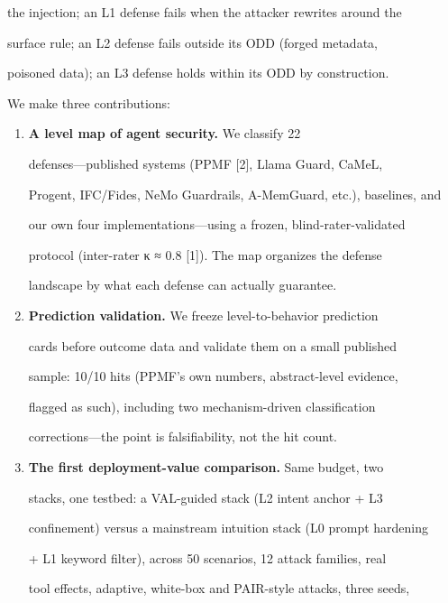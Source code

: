 \documentclass[

]{article}
\begin{document}
the injection; an L1 defense fails when the attacker rewrites around the

surface rule; an L2 defense fails outside its ODD (forged metadata,

poisoned data); an L3 defense holds within its ODD by construction.



We make three contributions:



\begin{enumerate}

\def\labelenumi{\arabic{enumi}.}

\item

  \textbf{A level map of agent security.} We classify 22

  defenses---published systems (PPMF {[}2{]}, Llama Guard, CaMeL,

  Progent, IFC/Fides, NeMo Guardrails, A-MemGuard, etc.), baselines, and

  our own four implementations---using a frozen, blind-rater-validated

  protocol (inter-rater κ ≈ 0.8 {[}1{]}). The map organizes the defense

  landscape by what each defense can actually guarantee.

\item

  \textbf{Prediction validation.} We freeze level-to-behavior prediction

  cards before outcome data and validate them on a small published

  sample: 10/10 hits (PPMF's own numbers, abstract-level evidence,

  flagged as such), including two mechanism-driven classification

  corrections---the point is falsifiability, not the hit count.

\item

  \textbf{The first deployment-value comparison.} Same budget, two

  stacks, one testbed: a VAL-guided stack (L2 intent anchor + L3

  confinement) versus a mainstream intuition stack (L0 prompt hardening

  + L1 keyword filter), across 50 scenarios, 12 attack families, real

  tool effects, adaptive, white-box and PAIR-style attacks, three seeds,


\end{enumerate}
\end{document}
